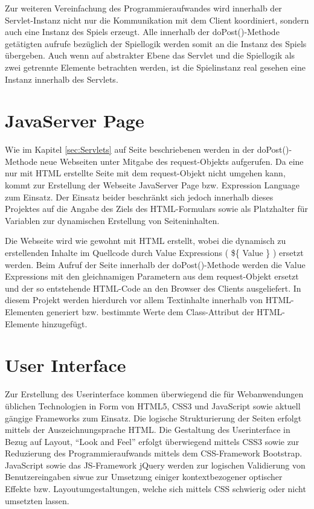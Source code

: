 Zur weiteren Vereinfachung des Programmieraufwandes wird innerhalb der Servlet-Instanz nicht nur die Kommunikation mit dem Client koordiniert, sondern auch eine Instanz des Spiels erzeugt. Alle innerhalb der doPost()-Methode getätigten aufrufe bezüglich der Spiellogik werden somit an die Instanz des Spiels übergeben. Auch wenn auf abstrakter Ebene das Servlet und die Spiellogik als zwei getrennte Elemente betrachten werden, ist die Spielinstanz real gesehen eine Instanz innerhalb des Servlets.

\section{JavaServer Page}
Wie im Kapitel \ref{sec:Servlets} auf Seite \pageref{sec:Servlets} beschriebenen werden in der doPost()-Methode neue Webseiten unter Mitgabe des request-Objekts aufgerufen. Da eine nur mit HTML erstellte Seite mit dem request-Objekt nicht umgehen kann, kommt zur Erstellung der Webseite JavaServer Page bzw. Expression Language zum Einsatz. Der Einsatz beider beschränkt sich jedoch innerhalb dieses Projektes auf die Angabe des Ziels des HTML-Formulars sowie als Platzhalter für Variablen zur dynamischen Erstellung von Seiteninhalten.

Die Webseite wird wie gewohnt mit HTML erstellt, wobei die dynamisch zu erstellenden Inhalte im Quellcode durch Value Expressions ( \$\{ Value \} ) ersetzt werden. Beim Aufruf der Seite innerhalb der doPost()-Methode werden die Value Expressions mit den gleichnamigen Parametern aus dem request-Objekt ersetzt und der so entstehende HTML-Code an den Browser des Clients ausgeliefert. In diesem Projekt werden hierdurch vor allem Textinhalte innerhalb von HTML-Elementen generiert bzw. bestimmte Werte dem Class-Attribut der HTML-Elemente hinzugefügt.

\section{User Interface}\label{UI}
Zur Erstellung des Userinterface kommen überwiegend die für Webanwendungen üblichen Technologien in Form von HTML5, CSS3 und JavaScript sowie aktuell gängige Frameworks zum Einsatz. Die logische Strukturierung der Seiten erfolgt mittels der Auszeichnungsprache HTML. Die Gestaltung des Userinterface in Bezug auf Layout, \enquote{Look and Feel} erfolgt überwiegend mittels CSS3 sowie zur Reduzierung des Programmieraufwands mittels dem CSS-Framework Bootstrap. JavaScript sowie das JS-Framework jQuery werden zur logischen Validierung von Benutzereingaben siwue zur Umsetzung einiger kontextbezogener optischer Effekte bzw. Layoutumgestaltungen, welche sich mittels CSS schwierig oder nicht umsetzten lassen.

